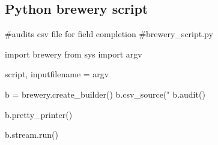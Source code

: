\subsection{Python brewery script}
\label{brewery_script.py}
\begin{pyverbatim}
 #audits csv file for field completion
 #brewery_script.py

import brewery
from sys import argv

script, inputfilename = argv

b = brewery.create_builder()
b.csv_source("%
b.audit()

b.pretty_printer()

b.stream.run()

\end{pyverbatim}







     

